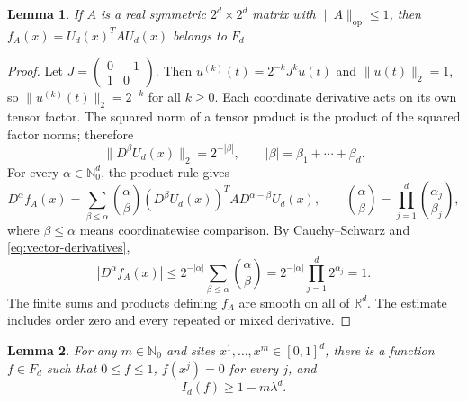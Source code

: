 \documentclass[11pt]{article}
\newtheorem{lemma}{Lemma}
\newcommand{\R}{\mathbb R}
\newcommand{\N}{\mathbb N}
\newcommand{\op}{\mathrm{op}}
\begin{document}
\begin{lemma}\label{lem:derivatives}
If $A$ is a real symmetric $2^d\times2^d$ matrix with
$\|A\|_\op\le1$, then
$f_A(x)=U_d(x)^T A U_d(x)$ belongs to $F_d$.
\end{lemma}

\begin{proof}
Let $J=\left(\begin{smallmatrix}0&-1\\1&0\end{smallmatrix}\right)$.
Then $u^{(k)}(t)=2^{-k}J^k u(t)$ and $\|u(t)\|_2=1$, so
$\|u^{(k)}(t)\|_2=2^{-k}$ for all $k\ge0$. Each coordinate derivative
acts on its own tensor factor. The squared norm of a tensor product is the
product of the squared factor norms; therefore
\begin{equation}\label{eq:vector-derivatives}
 \|D^\beta U_d(x)\|_2=2^{-|\beta|},\qquad
 |\beta|=\beta_1+\cdots+\beta_d.
\end{equation}
For every $\alpha\in\N_0^d$, the product rule gives
\[
 D^\alpha f_A(x)=\sum_{\beta\le\alpha}
 {\alpha\choose\beta}(D^\beta U_d(x))^T A D^{\alpha-\beta}U_d(x),
 \qquad {\alpha\choose\beta}=\prod_{j=1}^d{\alpha_j\choose\beta_j},
\]
where $\beta\le\alpha$ means coordinatewise comparison. By
Cauchy--Schwarz and \eqref{eq:vector-derivatives},
\[
 |D^\alpha f_A(x)|\le
 2^{-|\alpha|}\sum_{\beta\le\alpha}{\alpha\choose\beta}
 =2^{-|\alpha|}\prod_{j=1}^d2^{\alpha_j}=1.
\]
The finite sums and products defining $f_A$ are smooth on all of $\R^d$.
The estimate includes order zero and every repeated or mixed derivative.
\end{proof}

\begin{lemma}\label{lem:fooler}
For any $m\in\N_0$ and sites $x^1,\ldots,x^m\in[0,1]^d$, there is a
function $f\in F_d$ such that $0\le f\le1$, $f(x^j)=0$ for every $j$, and
\begin{equation}\label{eq:integral-fooler}
 I_d(f)\ge1-m\lambda^d.
\end{equation}
\end{lemma}
\end{document}
